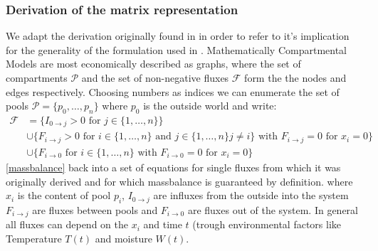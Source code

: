 \documentclass[journal abbreviation, manuscript]{copernicus}
\theoremstyle{definition}
\newcommand{\X}{\mathbf{X}}
\begin{document}
\subsubsection{Derivation of the matrix representation} 
We adapt the derivation originally found in \citep{Jacquez1972} in order to refer to it's implication for the generality of the formulation used in \citep{Luo2017Biogeosciences}.
Mathematically Compartmental Models are most economically described as graphs, where the set of compartments $\mathcal{P}$ and the set of non-negative fluxes $\mathcal{F}$ form the the nodes and edges respectively.  
Choosing numbers as indices we can enumerate  the set of pools $\mathcal{P}=\{p_0,\dots,p_n\}$ where $p_0$ is the outside world and write:
\begin{align*}
\mathcal{F} &=
\{
I_{0 \rightarrow j} > 0
\text{ for } j \in \{1,\dots ,n\}
\}  
\\
&
\cup
\{
F_{i \rightarrow j} > 0
\text{ for } i \in \{1,\dots ,n\} 
\text{ and } j \in \{1,\dots ,n\} j\ne i
\}
\text{ with }
F_{i \rightarrow j}=0 \text{ for }  x_{i} = 0 
\}
\\
&
\cup
\{
F_{i \rightarrow 0} 
\text{ for } i \in \{1,\dots ,n\} 
\text{ with }
F_{i \rightarrow 0}=0 \text{ for }  x_{i} = 0 
\}
\end{align*}
\eqref{massbalance} back into a set of equations for single fluxes from which
it was originally derived \citep{Jacquez1972} and for which massbalance is guaranteed by definition.
where $x_i$ is the content of pool $p_i$,
$ 
I_{0 \rightarrow j} 
$
are influxes from the outside into the system 
$
F_{i \rightarrow j} 
$
are fluxes between pools 
and 
$
F_{i \rightarrow 0} 
$
are fluxes out of the system.
In general all fluxes can depend on the $x_i$  and time $t$ (trough environmental factors like  Temperature $T(t)$ and moisture $W(t)$.
\end{document}
